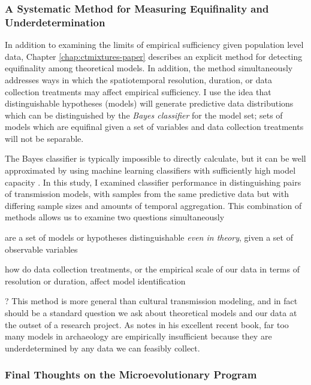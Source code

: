 \subsubsection{A Systematic Method for Measuring Equifinality and Underdetermination}\label{conc:sec:equifinality-underdetermination}

In addition to examining the limits of empirical sufficiency given population level data, Chapter \ref{chap:ctmixtures-paper} describes an explicit method for detecting equifinality among theoretical models.  In addition, the method simultaneously addresses  ways in which the spatiotemporal resolution, duration, or data collection treatments may affect empirical sufficiency.  I use the idea that distinguishable hypotheses (models) will generate predictive data distributions which can be distinguished by the \emph{Bayes classifier} for the model set; sets of models which are equifinal given a set of variables and data collection treatments will not be separable.

The Bayes classifier is typically impossible to directly calculate, but it can be well approximated by using machine learning classifiers with sufficiently high model capacity \citep{Hastie2009}.  In this study, I examined classifier performance in distinguishing pairs of transmission models, with samples from the same predictive data but with differing sample sizes and amounts of temporal aggregation.  This combination of methods allows us to examine two questions simultaneously \begin{dissparalist}
\item are a set of models or hypotheses distinguishable \emph{even in theory}, given a set of observable variables
\item how do data collection treatments, or the empirical scale of our data in terms of resolution or duration, affect model identification
\end{dissparalist}?  This method is more general than cultural transmission modeling, and in fact should be a standard question we ask about theoretical models and our data at the outset of a research project.  As \citet{perreault2019quality} notes in his excellent recent book, far too many models in archaeology are empirically insufficient because they are underdetermined by any data we can feasibly collect.  


\subsubsection{Final Thoughts on the Microevolutionary Program}\label{conc:sec:final-micro}

